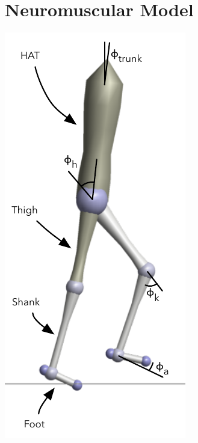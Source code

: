 \chapter{Neuromuscular Model}\label{sec:neuro_model}

\graphicspath{{chapters/neuromuscular_model/figures/}}

\begin{marginfigure}
    \centering
    \includegraphics[width=\linewidth]{neuro_mech_model}

\end{marginfigure}
